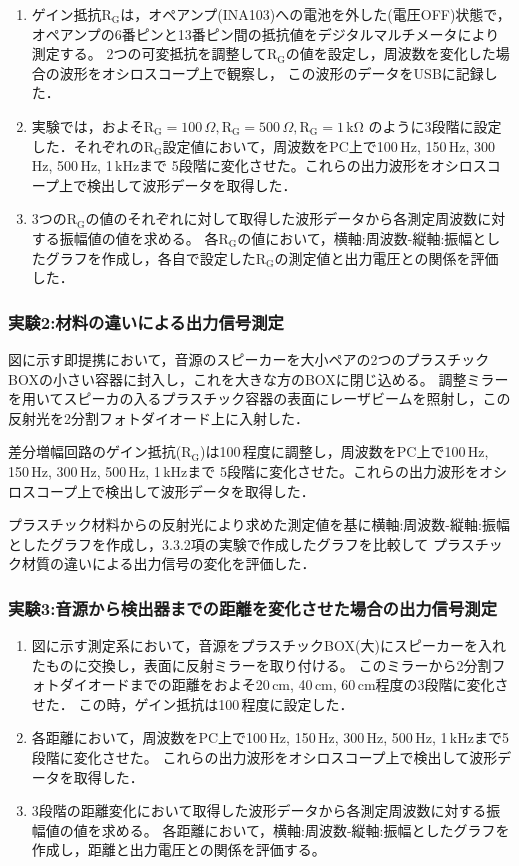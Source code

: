 \documentclass{ltjsarticle}
\begin{document}
			\begin{enumerate}
				\item ゲイン抵抗$\mathrm{R_G}$は，オペアンプ(INA103)への電池を外した(電圧OFF)状態で，
					オペアンプの6番ピンと13番ピン間の抵抗値をデジタルマルチメータにより測定する。
					2つの可変抵抗を調整して$\mathrm{R_G}$の値を設定し，周波数を変化した場合の波形をオシロスコープ上で観察し，
					この波形のデータをUSBに記録した．
				\item 実験では，およそ$\mathrm{R_G} = 100\,\Omega, \mathrm{R_G} = 500\,\Omega, \mathrm{R_G} = 1\,\mathrm{k\Omega}$
					のように3段階に設定した．それぞれの$\mathrm{R_G}$設定値において，周波数をPC上で100\,Hz, 150\,Hz, 300\,Hz, 500\,Hz, 1\,kHzまで
					5段階に変化させた。これらの出力波形をオシロスコープ上で検出して波形データを取得した．
				\item 3つの$\mathrm{R_G}$の値のそれぞれに対して取得した波形データから各測定周波数に対する振幅値の値を求める。
					各$\mathrm{R_G}$の値において，横軸:周波数-縦軸:振幅としたグラフを作成し，各自で設定した$\mathrm{R_G}$の測定値と出力電圧との関係を評価した．
			\end{enumerate}

		\subsubsection{実験2:材料の違いによる出力信号測定}
			図に示す即提携において，音源のスピーカーを大小ペアの2つのプラスチックBOXの小さい容器に封入し，これを大きな方のBOXに閉じ込める。
			調整ミラーを用いてスピーカの入るプラスチック容器の表面にレーザビームを照射し，この反射光を2分割フォトダイオード上に入射した．

			差分増幅回路のゲイン抵抗($\mathrm{R_G}$)は100\,\Omega 程度に調整し，周波数をPC上で100\,Hz, 150\,Hz, 300\,Hz, 500\,Hz, 1\,kHzまで
			5段階に変化させた。これらの出力波形をオシロスコープ上で検出して波形データを取得した．

			プラスチック材料からの反射光により求めた測定値を基に横軸:周波数-縦軸:振幅としたグラフを作成し，3.3.2項の実験で作成したグラフを比較して
			プラスチック材質の違いによる出力信号の変化を評価した．

		\subsubsection{実験3:音源から検出器までの距離を変化させた場合の出力信号測定}
			\begin{enumerate}
				\item 図に示す測定系において，音源をプラスチックBOX(大)にスピーカーを入れたものに交換し，表面に反射ミラーを取り付ける。
					このミラーから2分割フォトダイオードまでの距離をおよそ20\,cm, 40\,cm, 60\,cm程度の3段階に変化させた．
					この時，ゲイン抵抗は100\,\Omega 程度に設定した．
				\item 各距離において，周波数をPC上で100\,Hz, 150\,Hz, 300\,Hz, 500\,Hz, 1\,kHzまで5段階に変化させた。
					これらの出力波形をオシロスコープ上で検出して波形データを取得した．
				\item 3段階の距離変化において取得した波形データから各測定周波数に対する振幅値の値を求める。
					各距離において，横軸:周波数-縦軸:振幅としたグラフを作成し，距離と出力電圧との関係を評価する。
			\end{enumerate}
\end{document}
